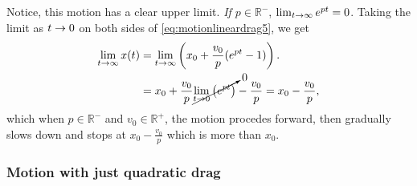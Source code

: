 Notice, this motion has a clear upper limit. \emph{If $p \in \mathbb{R}^-$}, $\lim_{t \rightarrow \infty}e^{pt} = 0$. Taking the limit as $t \rightarrow 0$ on both sides of \cref{eq:motionlineardrag5}, we get
\begin{align*}
    \lim_{t \rightarrow \infty} x(t) &= \lim_{t \rightarrow \infty}\left(x_0 + \frac{v_0}{p}(e^{pt} - 1)\right). \\
    &= x_0 + \frac{v_0}{p}\cancelto{0}{\lim_{t \rightarrow 0}\left(e^{pt}\right)} - \frac{v_0}{p} = x_0 - \frac{v_0}{p},
\end{align*}
which when $p \in \mathbb{R}^-$ and $v_0\in\mathbb{R}^+$, the motion procedes forward, then gradually slows down and stops at $x_0 - \frac{v_0}{p}$ which is more than $x_0$.

\subsubsection{Motion with just quadratic drag}


